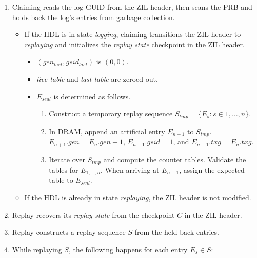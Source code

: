 \documentclass[12pt,a4paper,twoside]{book}
\begin{document}
\begin{enumerate}[noitemsep,beginpenalty=100000,midpenalty=100000]
    \item \label{ccReplay:claimscan} Claiming reads the log GUID from the ZIL header, then scans the PRB and holds back the log's entries from garbage collection.
    \begin{itemize}[noitemsep,beginpenalty=100000,midpenalty=100000]
        \item \label{ccReplay:transitionToReplaying} If the HDL is in state \textit{logging}, claiming transitions the ZIL header to \textit{replaying} and initializes the \textit{replay state} checkpoint in the ZIL header.
            \begin{itemize}
                \item $(gen_{last}, gsid_{last})$ is $(0, 0)$.
                \item \textit{live table} and \textit{last table} are zeroed out.
                \item $E_{seal}$ is determined as follows.
                \begin{enumerate}
                    \item Construct a temporary replay sequence $S_{tmp} = \{E_s : s \in 1, \dots, n\}$.
                    \item In DRAM, append an artificial entry $E_{n+1}$ to $S_{tmp}$.
                        $E_{n+1}.gen = E_{n}.gen + 1$, $E_{n+1}.gsid = 1$, and $E_{n+1}.txg = E_{n}.txg$.
                    \item Iterate over $S_{tmp}$ and compute the counter tables.
                        Validate the tables for $E_{1,\dots,n}$.
                        When arriving at $E_{n+1}$, assign the expected table to $E_{seal}$.
                \end{enumerate}
            \end{itemize}
        \item If the HDL is already in state \textit{replaying}, the ZIL header is not modified.
    \end{itemize}
    \item Replay recovers its \textit{replay state} from the checkpoint $C$ in the ZIL header.
    \item \label{ccReplay:construct_sequence} Replay constructs a replay sequence $S$ from the held back entries.
    \item While replaying $S$, the following happens for each entry $E_s \in S$:
        \begin{enumerate}[noitemsep,beginpenalty=100000,midpenalty=100000]

\end{enumerate}
\end{enumerate}
\end{document}
